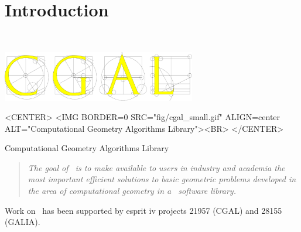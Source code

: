 
\chapter{Introduction}
\label{chap:intro}
 \\

\begin{ccTexOnly}
\begin{center}
  \includegraphics[width=240pt]{Developers_manual/fig/cgal}
\end{center}
\end{ccTexOnly}

\begin{ccHtmlOnly}
<CENTER>
<IMG BORDER=0 SRC="fig/cgal_small.gif" 
  ALIGN=center ALT="Computational Geometry Algorithms Library"><BR>
</CENTER>
\end{ccHtmlOnly}
\centerline{{\sc Computational Geometry Algorithms Library}}


\begin{quote}
{\em The goal of \cgal\ is to make available to users in industry and academia
the most important efficient solutions to basic geometric problems
developed in the area of computational geometry in a \CC\ software library.}
\end{quote}

Work on \cgal\ has been supported by {\sc esprit iv} projects 21957 (CGAL) and
28155 (GALIA).


\InternalOnly{

}







